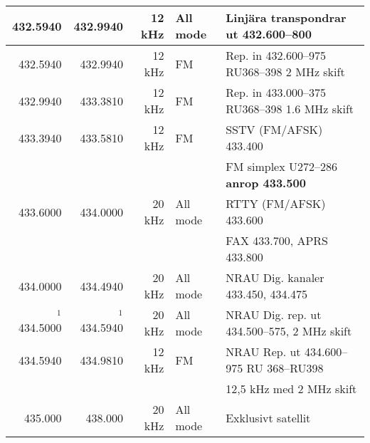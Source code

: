 \begin{landscape}
\begin{tabular}{rrrll}
	         432.5940         & 432.9940      & 12 kHz      & All mode        & Linjära transpondrar ut 432.600--800                         \\ \hline
	         432.5940         & 432.9940      & 12 kHz      & FM              & Rep. in 432.600--975 RU368--398 2 MHz skift                  \\ \hline
	         432.9940         & 433.3810      & 12 kHz      & FM              & Rep. in 433.000--375 RU368--398 1.6 MHz skift                \\ \hline
	         433.3940         & 433.5810      & 12 kHz      & FM              & SSTV (FM/AFSK) 433.400                                       \\
                                  &               &             &                 & FM simplex U272--286 \textbf{anrop 433.500}                  \\ \hline
	         433.6000         & 434.0000      & 20 kHz      & All mode        & RTTY (FM/AFSK) 433.600                                       \\
                                  &               &             &                 & FAX 433.700, APRS 433.800                                    \\ \hline
	         434.0000         & 434.4940      & 20 kHz      & All mode        & NRAU Dig. kanaler 433.450, 434.475                           \\ \hline
	    $^1$ 434.5000         & $^1$ 434.5940 & 20 kHz      & All mode        & NRAU Dig. rep. ut 434.500--575, 2 MHz skift                  \\ \hline
	         434.5940         & 434.9810      & 12 kHz      & FM              & NRAU Rep. ut 434.600--975 RU 368--RU398                      \\
                                  &               &             &                 & 12,5 kHz med 2 MHz skift                                     \\ \hline
	          435.000         & 438.000       & 20 kHz      & All mode        & Exklusivt satellit
\end{tabular}

\end{landscape}
